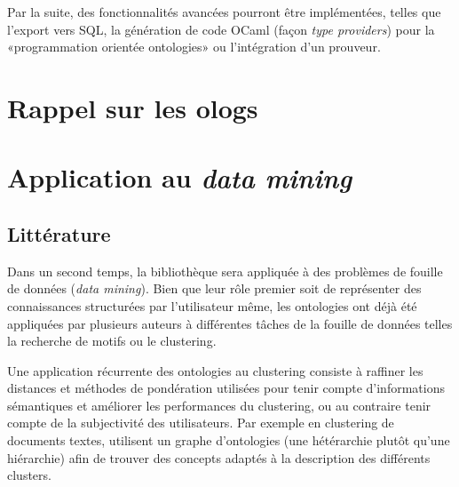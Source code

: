 \documentclass[a4paper]{scrartcl}
\begin{document}
Par la suite, des fonctionnalités avancées pourront être implémentées, telles
que l'export vers SQL, la génération de code OCaml (façon \emph{type
providers}) pour la «programmation orientée ontologies» ou l'intégration d'un
prouveur.

\section{Rappel sur les ologs}

\section{Application au \emph{data mining}}

\subsection{Littérature}

Dans un second temps, la bibliothèque sera appliquée à des problèmes de fouille
de données (\emph{data mining}). Bien que leur rôle premier soit de représenter
des connaissances structurées par l'utilisateur même, les ontologies ont déjà
été appliquées par plusieurs auteurs à différentes tâches de la fouille de
données telles la recherche de motifs ou le clustering.

Une application récurrente des ontologies au clustering consiste à raffiner les
distances et méthodes de pondération utilisées pour tenir compte d'informations
sémantiques et améliorer les performances du clustering, ou au contraire tenir
compte de la subjectivité des utilisateurs. Par exemple en clustering de
documents textes, \textcite{hotho-ontology-clustering} utilisent un graphe
d'ontologies (une hétérarchie plutôt qu'une hiérarchie) afin de trouver des
concepts adaptés à la description des différents clusters.

\printbibliography
\end{document}

